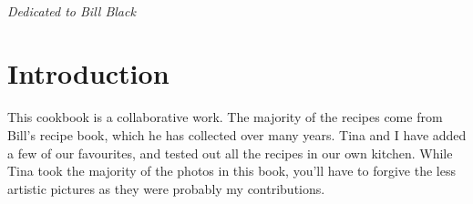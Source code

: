 \documentclass{tufte-book}
\begin{document}
\cleardoublepage
\tableofcontents


\cleardoublepage
~\vfill
\begin{doublespace}
\noindent\fontsize{18}{22}\selectfont\itshape
\nohyphenation
Dedicated to Bill Black
\end{doublespace}
\vfill
\vfill


\cleardoublepage
\chapter*{Introduction}

This cookbook is a collaborative work. The majority of the recipes come from Bill's recipe book, which he has collected over many years. Tina and I have added a few of our favourites, and tested out all the recipes in our own kitchen. While Tina took the majority of the photos in this book, you'll have to forgive the less artistic pictures as they were probably my contributions.




\mainmatter
\end{document}
